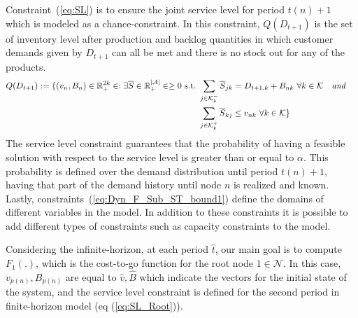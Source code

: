 \documentclass[10pt]{article}
\newcommand{\ti}{t} %
\newcommand{\ka}{k} %
\newcommand{\KA}{\mathcal{K}}
\newcommand{\jey}{j} %
\newcommand{\Graf}{\mathcal{A}} %
\newcommand{\Bi}{B} %
\newcommand{\Vi}{v} %
\newcommand{\Es}{S} %
\newcommand{\x}{x} %
\newcommand{\y}{y} %
\newcommand{\InvPos}{inventory level after production }
\newcommand{\Csub}{\mathcal{K}^+_k}
\newcommand{\Psub}{\mathcal{K}^-_k}
\newcommand{\tAct}{\hat{\ti}} %
\begin{document}
Constraint~(\ref{eq:SL}) is to ensure the joint service level for period $\ti(n)+1$ which is modeled as a chance-constraint. In this constraint, $Q(D_ {\ti+1})$ is the set of \InvPos and backlog quantities in which customer demands given by $D_{\ti+1}$ can all be met and there is no stock out for any of the products.
\begin{align} Q(D_ {\ti +1}) := \{ (v_n,B_n) \in \mathbb{R}_{+}^{2\ka} \in  :  \exists \overline{\Es} \in \mathbb{R}_{+}^{|\Graf|} \in \geq 0 \ \text{s.t.} \ 
 & \sum_{\jey \in  \Psub} \overline{\Es}_{\jey \ka } = D_{\ti+1,\ka} + \Bi_{n\ka} \ \forall \ka  \in \KA  \quad \textit{and }\notag \\
 & \sum_{\jey \in  \Csub} \overline{\Es}_{\ka \jey} \leq \Vi_{n\ka} \ \forall \ka  \in \KA \} & \label{eq:SetQ}
 \end{align}
  The service level constraint guarantees that the probability of having a feasible solution with respect to the service level is greater than or equal to $\alpha$. 
 This probability is defined over the demand distribution until period $\ti(n)+1$, having that part of the demand history until node $n$ is realized and known. Lastly, constraints~(\ref{eq:Dyn_F_Sub_ST_bound1}) define the domains of different variables in the model.
In addition to these constraints it is possible to add different types of constraints such as capacity constraints to the model.

Considering the infinite-horizon, at each period $\tAct$, our main goal is to compute $F_{1}(.)$, which is the cost-to-go function for the root node $1 \in \mathcal{N}$. In this case, $\Vi_{p(n)}, \Bi_{p(n)}$ are equal to $\hat{\Vi},\hat{\Bi}$ which indicate the vectors for the initial state of the system, and the service level constraint is defined for the second period in finite-horizon model (eq (\ref{eq:SL_Root})).



\end{document}

